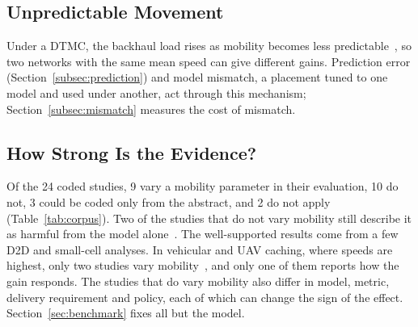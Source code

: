 \subsection{Unpredictable Movement}
\label{subsec:mech-predict}

Under a DTMC, the backhaul load rises as mobility becomes less predictable~\cite{ozfatura2020mobility}, so two networks with the same mean speed can give different gains. Prediction error (Section~\ref{subsec:prediction}) and model mismatch, a placement tuned to one model and used under another, act through this mechanism; Section~\ref{subsec:mismatch} measures the cost of mismatch.

\subsection{How Strong Is the Evidence?}
\label{subsec:evidence}

Of the 24 coded studies, 9 vary a mobility parameter in their evaluation, 10 do not, 3 could be coded only from the abstract, and 2 do not apply (Table~\ref{tab:corpus}). Two of the studies that do not vary mobility still describe it as harmful from the model alone~\cite{yu2021mobility,choi2023deep}. The well-supported results come from a few D2D and small-cell analyses. In vehicular and UAV caching, where speeds are highest, only two studies vary mobility~\cite{alnagar2022mobility,wang2024markov}, and only one of them reports how the gain responds. The studies that do vary mobility also differ in model, metric, delivery requirement and policy, each of which can change the sign of the effect. Section~\ref{sec:benchmark} fixes all but the model.
